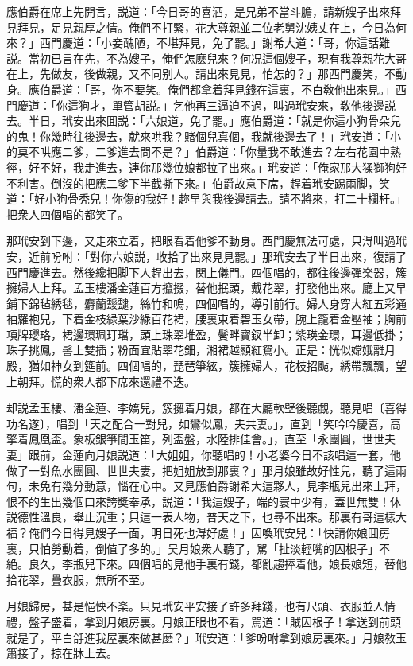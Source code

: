 應伯爵在席上先開言，説道：「今日哥的喜酒，是兄弟不當斗膽，請新嫂子出來拜見拜見，足見親厚之情。俺們不打緊，花大尊親並二位老舅沈姨丈在上，今日為何來？」西門慶道：「小妾醜陋，不堪拜見，免了罷。」謝希大道：「哥，你這話難説。當初已言在先，不為嫂子，俺們怎麽兒來？何况這個嫂子，現有我尊親花大哥在上，先做友，後做親，又不同别人。請出來見見，怕怎的？」那西門慶笑，不動身。應伯爵道：「哥，你不要笑。俺們都拿着拜見錢在這裏，不白敎他出來見。」西門慶道：「你這狗才，單管胡説。」乞他再三逼迫不過，叫過玳安來，敎他後邊説去。半日，玳安出來囬説：「六娘道，免了罷。」應伯爵道：「就是你這小狗骨朵兒的鬼！你幾時往後邊去，就來哄我？賭個兒真個，我就後邊去了！」玳安道：「小的莫不哄應二爹，二爹進去問不是？」伯爵道：「你量我不敢進去？左右花園中熟徑，好不好，我走進去，連你那幾位娘都拉了出來。」玳安道：「俺家那大猱獅狗好不利害。倒沒的把應二爹下半截撕下來。」伯爵故意下席，趕着玳安踢兩脚，笑道：「好小狗骨秃兒！你傷的我好！趂早與我後邊請去。請不將來，打二十欄杆。」把衆人四個唱的都笑了。

那玳安到下邊，又走來立着，把眼看着他爹不動身。西門慶無法可處，只淂叫過玳安，近前吩咐：「對你六娘説，收拾了出來見見罷。」那玳安去了半日出來，復請了西門慶進去。然後纔把脚下人趕出去，関上儀門。四個唱的，都往後邊彈楽器，簇擁婦人上拜。孟玉樓潘金蓮百方攛掇，替他抿頭，戴花翠，打發他出來。廳上又早鋪下錦毡綉毯，麝蘭靉靆，絲竹和鳴，四個唱的，導引前行。婦人身穿大紅五彩通袖羅袍兒，下着金枝緑葉沙綠百花裙，腰裏束着碧玉女帶，腕上籠着金壓袖；胸前項牌瓔珞，裙邊環珮玎璫，頭上珠翠堆盈，鬢畔寳釵半卸；紫瑛金環，耳邊低掛；珠子挑鳳，髻上雙插；粉面宜貼翠花鈿，湘裙越顯紅鴛小。正是：恍似嫦娥離月殿，猶如神女到筵前。四個唱的，琵琶箏絃，簇擁婦人，花枝招颭，綉帶飄飄，望上朝拜。慌的衆人都下席來還禮不迭。

却説孟玉樓、潘金蓮、李嬌兒，簇擁着月娘，都在大廳軟壁後聽覷，聽見唱〔喜得功名遂〕，唱到「天之配合一對兒，如鸞似鳳，夫共妻。」，直到「笑吟吟慶喜，高擎着鳳凰盃。象板銀箏間玉笛，列盃盤，水陸排佳會。」，直至「永團圓，世世夫妻」跟前，金蓮向月娘説道：「大姐姐，你聽唱的！小老婆今日不該唱這一套，他做了一對魚水團圓、世世夫妻，把姐姐放到那裏？」那月娘雖故好性兒，聽了這兩句，未免有幾分動意，惱在心中。又見應伯爵謝希大這夥人，見李瓶兒出來上拜，恨不的生出幾個口來誇獎奉承，説道：「我這嫂子，端的寰中少有，蓋世無雙！休説德性溫良，舉止沉重；只這一表人物，普天之下，也尋不出來。那裏有哥這樣大福？俺們今日得見嫂子一面，明日死也淂好處！」因喚玳安兒：「快請你娘囬房裏，只怕勞動着，倒值了多的。」吴月娘衆人聽了，駡「扯淡輕嘴的囚根子」不絶。良久，李瓶兒下來。四個唱的見他手裏有錢，都亂趨捧着他，娘長娘短，替他拾花翠，疊衣服，無所不至。

月娘歸房，甚是悒怏不楽。只見玳安平安接了許多拜錢，也有尺頭、衣服並人情禮，盤子盛着，拿到月娘房裏。月娘正眼也不看，駡道：「賊囚根子！拿送到前頭就是了，平白㧱進我屋裏來做甚麽？」玳安道：「爹吩咐拿到娘房裏來。」月娘敎玉簫接了，掠在牀上去。


